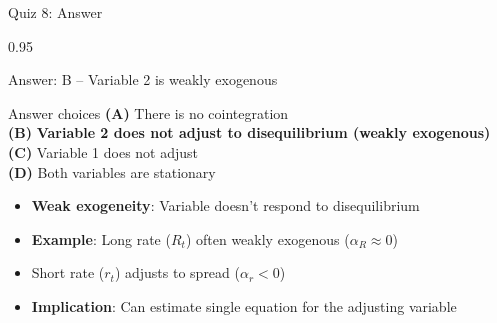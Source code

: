 \documentclass[9pt, aspectratio=169, t]{beamer}
\begin{document}
\begin{frame}{Quiz 8: Answer}
    \begin{cminipage}{0.95\textwidth}
    {\small
    \begin{exampleblock}{Answer: B -- Variable 2 is weakly exogenous}

    \begin{block}{Answer choices}
        \textcolor{MainBlue}{\textbf{(A)}} There is no cointegration \incorrect\\[3pt]
        \textcolor{MainBlue}{\textbf{(B)}} \textbf{\textcolor{Forest}{Variable 2 does not adjust to disequilibrium (weakly exogenous)}} \correct\\[3pt]
        \textcolor{MainBlue}{\textbf{(C)}} Variable 1 does not adjust \incorrect\\[3pt]
        \textcolor{MainBlue}{\textbf{(D)}} Both variables are stationary \incorrect
    \end{block}

        \vspace{0.2cm}

        \begin{itemize}
            \item \textbf{Weak exogeneity}: Variable doesn't respond to disequilibrium
            \item \textbf{Example}: Long rate ($R_t$) often weakly exogenous ($\alpha_R \approx 0$)
            \item Short rate ($r_t$) adjusts to spread ($\alpha_r < 0$)
            \item \textbf{Implication}: Can estimate single equation for the adjusting variable
        \end{itemize}
    \end{exampleblock}
    }
    \end{cminipage}
\end{frame}
\end{document}
